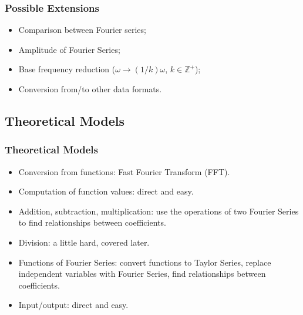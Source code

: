 \documentclass{beamer}
\begin{document}
	\begin{frame}
		\frametitle{Possible Extensions}
		\begin{itemize}
			\item Comparison between Fourier series;
			\item Amplitude of Fourier Series;
			\item Base frequency reduction ($\omega \rightarrow(1/k)\omega$, $k\in\mathbb{Z}^{+}$); 
			\item Conversion from/to other data formats.
	\end{itemize}
	\end{frame}

	\subsection{Theoretical Models}
	\begin{frame}
		\frametitle{Theoretical Models}
		\begin{itemize}
			\item Conversion from functions: Fast Fourier Transform (FFT).
			\item Computation of function values: direct and easy.
			\item Addition, subtraction, multiplication: use the operations of two Fourier Series to find relationships between coefficients.
			\item Division: a little hard, covered later.
			\item Functions of Fourier Series: convert functions to Taylor Series, replace independent variables with Fourier Series, find relationships between coefficients.
			\item Input/output: direct and easy.
		\end{itemize}
	\end{frame}
\end{document}
